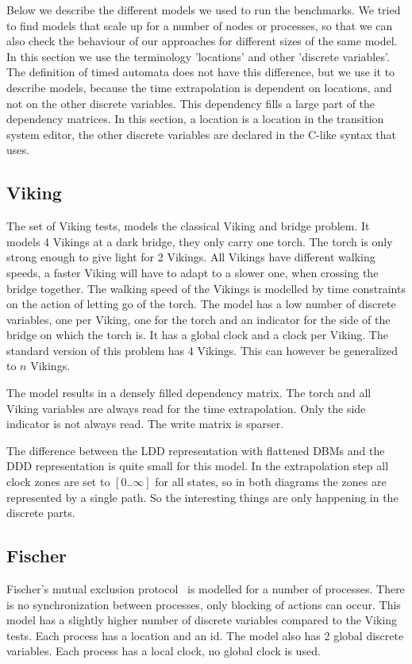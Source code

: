 Below we describe the different models we used to run the benchmarks. We tried to find models that scale up for a number of nodes or processes, so that we can also check the behaviour of our approaches for different sizes of the same model. In this section we use the terminology 'locations' and other 'discrete variables'. The definition of timed automata does not have this difference, but we use it to describe models, because the time extrapolation is dependent on locations, and not on the other discrete variables. This dependency fills a large part of the dependency matrices. In this section, a location is a location in the \uppaal{} transition system editor, the other discrete variables are declared in the C-like syntax that \uppaal{} uses.

\subsection{Viking}
The set of Viking tests, models the classical Viking and bridge problem. It models 4 Vikings at a dark bridge, they only carry one torch. The torch is only strong enough to give light for 2 Vikings. All Vikings have different walking speeds, a faster Viking will have to adapt to a slower one, when crossing the bridge together. The walking speed of the Vikings is modelled by time constraints on the action of letting go of the torch. The model has a low number of discrete variables, one per Viking, one for the torch and an indicator for the side of the bridge on which the torch is. It has a global clock and a clock per Viking. The standard version of this problem has 4 Vikings. This can however be generalized to $n$ Vikings.

The model results in a densely filled dependency matrix. The torch and all Viking variables are always read for the time extrapolation. Only the side indicator is not always read. The write matrix is sparser. 

The difference between the LDD representation with flattened DBMs and the DDD representation is quite small for this model. In the extrapolation step all clock zones are set to $[0..\infty]$ for all states, so in both diagrams the zones are represented by a single path. So the interesting things are only happening in the discrete parts.

\subsection{Fischer}
Fischer's mutual exclusion protocol~\cite{Lamport:1987:FME:7351.7352} is modelled for a number of processes. There is no synchronization between processes, only blocking of actions can occur. This model has a slightly higher number of discrete variables compared to the Viking tests. Each process has a location and an id. The model also has 2 global discrete variables. Each process has a local clock, no global clock is used.

